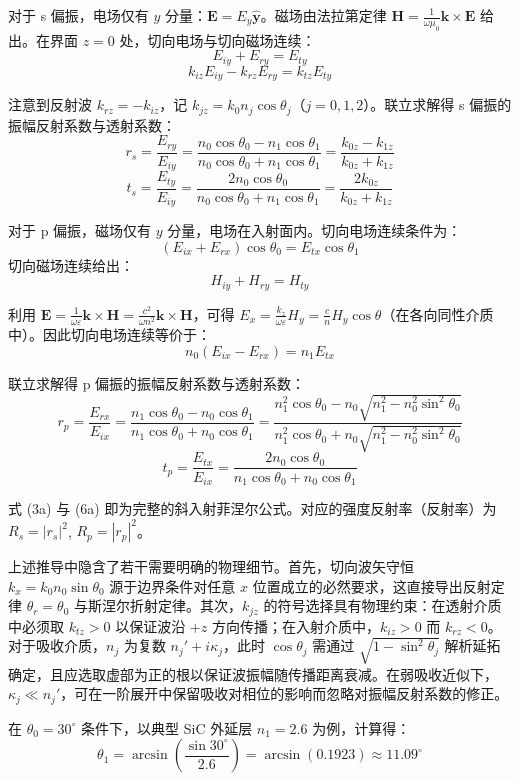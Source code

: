 \documentclass{mcmthesis}
\begin{document}
\begin{table}[htbp]
对于 s 偏振，电场仅有 $y$ 分量：$\mathbf{E} = E_y \hat{\mathbf{y}}$。磁场由法拉第定律 $\mathbf{H} = \frac{1}{\omega\mu_0}\mathbf{k}\times\mathbf{E}$ 给出。在界面 $z = 0$ 处，切向电场与切向磁场连续：
$$E_{iy} + E_{ry} = E_{ty} \tag{2a}$$
$$k_{iz}E_{iy} - k_{rz}E_{ry} = k_{tz}E_{ty} \tag{2b}$$

注意到反射波 $k_{rz} = -k_{iz}$，记 $k_{jz} = k_0 n_j\cos\theta_j$（$j = 0, 1, 2$）。联立求解得 s 偏振的振幅反射系数与透射系数：
$$r_s = \frac{E_{ry}}{E_{iy}} = \frac{n_0\cos\theta_0 - n_1\cos\theta_1}{n_0\cos\theta_0 + n_1\cos\theta_1} = \frac{k_{0z} - k_{1z}}{k_{0z} + k_{1z}} \tag{3a}$$
$$t_s = \frac{E_{ty}}{E_{iy}} = \frac{2n_0\cos\theta_0}{n_0\cos\theta_0 + n_1\cos\theta_1} = \frac{2k_{0z}}{k_{0z} + k_{1z}} \tag{3b}$$

对于 p 偏振，磁场仅有 $y$ 分量，电场在入射面内。切向电场连续条件为：
$$(E_{ix} + E_{rx})\cos\theta_0 = E_{tx}\cos\theta_1 \tag{4a}$$
切向磁场连续给出：
$$H_{iy} + H_{ry} = H_{ty} \tag{4b}$$

利用 $\mathbf{E} = \frac{1}{\omega\varepsilon}\mathbf{k}\times\mathbf{H} = \frac{c^2}{\omega n^2}\mathbf{k}\times\mathbf{H}$，可得 $E_x = \frac{k_z}{\omega\varepsilon}H_y = \frac{c}{n}H_y\cos\theta$（在各向同性介质中）。因此切向电场连续等价于：
$$n_0(E_{ix} - E_{rx}) = n_1 E_{tx} \tag{5}$$

联立求解得 p 偏振的振幅反射系数与透射系数：
$$r_p = \frac{E_{rx}}{E_{ix}} = \frac{n_1\cos\theta_0 - n_0\cos\theta_1}{n_1\cos\theta_0 + n_0\cos\theta_1} = \frac{n_1^2\cos\theta_0 - n_0\sqrt{n_1^2-n_0^2\sin^2\theta_0}}{n_1^2\cos\theta_0 + n_0\sqrt{n_1^2-n_0^2\sin^2\theta_0}} \tag{6a}$$
$$t_p = \frac{E_{tx}}{E_{ix}} = \frac{2n_0\cos\theta_0}{n_1\cos\theta_0 + n_0\cos\theta_1} \tag{6b}$$

式 (3a) 与 (6a) 即为完整的斜入射菲涅尔公式。对应的强度反射率（反射率）为 $R_s = |r_s|^2$, $R_p = |r_p|^2$。

上述推导中隐含了若干需要明确的物理细节。首先，切向波矢守恒 $k_x = k_0 n_0\sin\theta_0$ 源于边界条件对任意 $x$ 位置成立的必然要求，这直接导出反射定律 $\theta_r = \theta_0$ 与斯涅尔折射定律。其次，$k_{jz}$ 的符号选择具有物理约束：在透射介质中必须取 $k_{tz} > 0$ 以保证波沿 $+z$ 方向传播；在入射介质中，$k_{iz} > 0$ 而 $k_{rz} < 0$。对于吸收介质，$n_j$ 为复数 $n_j' + i\kappa_j$，此时 $\cos\theta_j$ 需通过 $\sqrt{1-\sin^2\theta_j}$ 解析延拓确定，且应选取虚部为正的根以保证波振幅随传播距离衰减。在弱吸收近似下，$\kappa_j \ll n_j'$，可在一阶展开中保留吸收对相位的影响而忽略对振幅反射系数的修正。

在 $\theta_0 = 30^\circ$ 条件下，以典型 SiC 外延层 $n_1 = 2.6$ 为例，计算得：
$$\theta_1 = \arcsin\left(\frac{\sin 30^\circ}{2.6}\right) = \arcsin(0.1923) \approx 11.09^\circ$$


\end{table}
\end{document}
